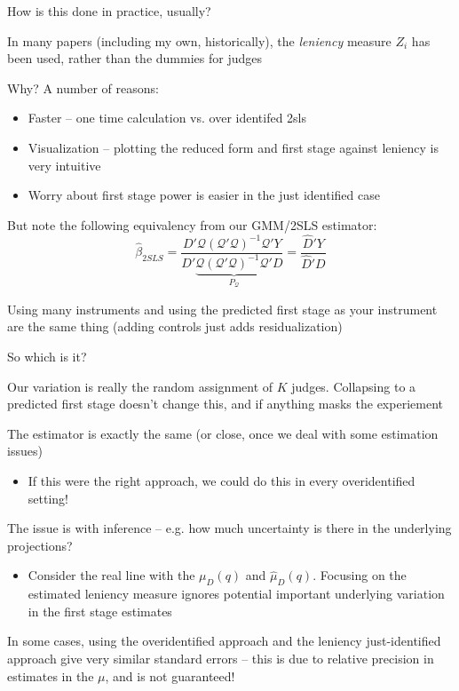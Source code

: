 \documentclass[notes,11pt, aspectratio=169]{beamer}
\newenvironment{wideitemize}{\itemize\addtolength{\itemsep}{10pt}}{\enditemize}
\begin{document}
\begin{frame}{How is this done in practice, usually?}
  \begin{wideitemize}
  \item In many papers (including my own, historically), the
    \emph{leniency} measure $Z_{i}$ has been used, rather than the
    dummies for judges
  \item Why? A number of reasons:
    \begin{itemize}
    \item Faster -- one time calculation vs. over identifed 2sls
    \item Visualization -- plotting the reduced form and first stage against leniency is very intuitive
    \item Worry about first stage power is easier in the just identified case
    \end{itemize}
  \item But note the following equivalency from our GMM/2SLS estimator:
    \begin{equation}
      \hat{\beta}_{2SLS} = \frac{D'\mathcal{Q}(\mathcal{Q}'\mathcal{Q})^{-1}\mathcal{Q}'Y}{D'\underbrace{\mathcal{Q}(\mathcal{Q}'\mathcal{Q})^{-1}\mathcal{Q}'}_{P_{\mathcal{Q}}}D} = \frac{\hat{D}'Y}{\hat{D}'D} 
    \end{equation}
  \item Using many instruments and using the predicted first stage
    as your instrument are the same thing (adding controls just adds residualization)
  \end{wideitemize}
\end{frame}

\begin{frame}{So which is it?}
  \begin{wideitemize}
  \item Our variation is really the random assignment of $K$
    judges. Collapsing to a predicted first stage doesn't change this,
    and if anything masks the experiement
  \item The estimator is exactly the same (or close, once we deal with
    some estimation issues)
    \begin{itemize}
    \item If this were the right approach, we could do this in every overidentified setting! 
    \end{itemize}
  \item The issue is with inference -- e.g. how much uncertainty is there in the underlying projections?
    \begin{itemize}
    \item Consider the real line with the $\mu_{D}(q)$ and
      $\hat{\mu}_{D}(q)$. Focusing on the estimated leniency measure
      ignores potential important underlying variation in the first stage estimates
    \end{itemize}
  \item In some cases, using the overidentified approach and the
    leniency just-identified approach give very similar standard
    errors -- this is due to relative precision in estimates
    in the $\mu$, and is not guaranteed!
  \end{wideitemize}
\end{frame}
\end{document}
